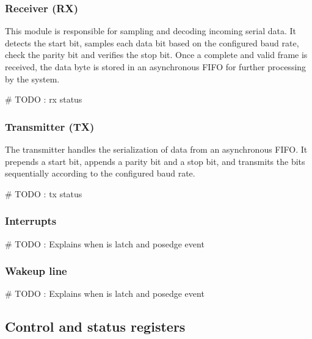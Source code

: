 \documentclass[12pt]{article}
\begin{document}
\subsubsection{Receiver (RX)}
This module is responsible for sampling and decoding incoming serial data. It 
detects the start bit, samples each data bit based on the configured baud rate, 
check the parity bit and verifies the stop bit. Once a complete and valid frame 
is received, the data byte is stored in an asynchronous FIFO for further 
processing by the system.

\# TODO : rx status

\subsubsection{Transmitter (TX)}
The transmitter handles the serialization of data from an asynchronous FIFO. 
It prepends a start bit, appends a parity bit and a stop bit, and transmits the 
bits sequentially according to the configured baud rate.

\# TODO : tx status

\subsubsection{Interrupts}
\# TODO : Explains when is latch and posedge event
\subsubsection{Wakeup line}
\# TODO : Explains when is latch and posedge event

\subsection{Control and status registers}
\end{document}
